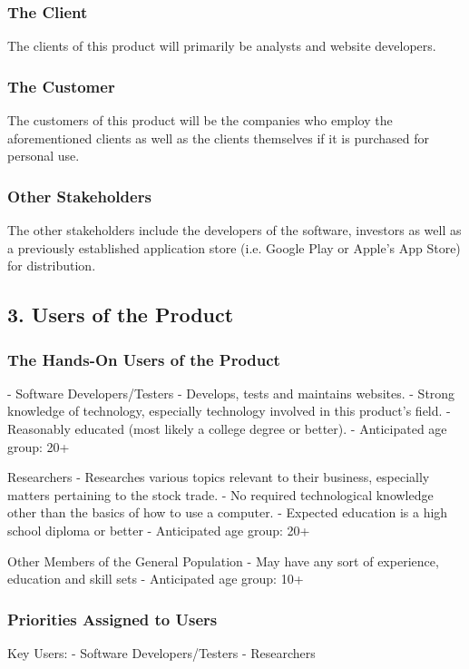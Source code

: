 \documentclass[titlepage]{article}
\begin{document}
\subsubsection*{The Client}
The clients of this product will primarily be analysts and website developers.

\subsubsection*{The Customer}
The customers of this product will be the companies who employ the aforementioned clients as well as the clients themselves if it is purchased for personal use.

\subsubsection*{Other Stakeholders}
The other stakeholders include the developers of the software, investors as well as a previously established application store (i.e. Google Play or Apple’s App Store) for distribution.

\subsection{3. Users of the Product}

\subsubsection*{The Hands-On Users of the Product}
- Software Developers/Testers
- Develops, tests and maintains websites.
- Strong knowledge of technology, especially technology involved in this product’s field.
- Reasonably educated (most likely a college degree or better).
- Anticipated age group: 20+

Researchers
- Researches various topics relevant to their business, especially matters pertaining to the stock trade.
- No required technological knowledge other than the basics of how to use a computer.
- Expected education is a high school diploma or better
- Anticipated age group: 20+

Other Members of the General Population
- May have any sort of experience, education and skill sets
- Anticipated age group: 10+


\subsubsection*{Priorities Assigned to Users}
Key Users:
- Software Developers/Testers
- Researchers
\end{document}
